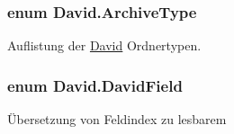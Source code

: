 \subsubsection[{\texorpdfstring{Archive\+Type}{ArchiveType}}]{\setlength{\rightskip}{0pt plus 5cm}enum {\bf David.\+Archive\+Type}\hspace{0.3cm}{\ttfamily [strong]}}\hypertarget{namespace_david_a2d1a5df179d8a1b80864c994cca79cfa}{}\label{namespace_david_a2d1a5df179d8a1b80864c994cca79cfa}




Auflistung der \hyperlink{namespace_david}{David} Ordnertypen. 
\subsubsection[{\texorpdfstring{David\+Field}{DavidField}}]{\setlength{\rightskip}{0pt plus 5cm}enum {\bf David.\+David\+Field}\hspace{0.3cm}{\ttfamily [strong]}}\hypertarget{namespace_david_a0d17e537424ac42d1893cdde1d1cf65f}{}\label{namespace_david_a0d17e537424ac42d1893cdde1d1cf65f}


Übersetzung von Feldindex zu lesbarem 

